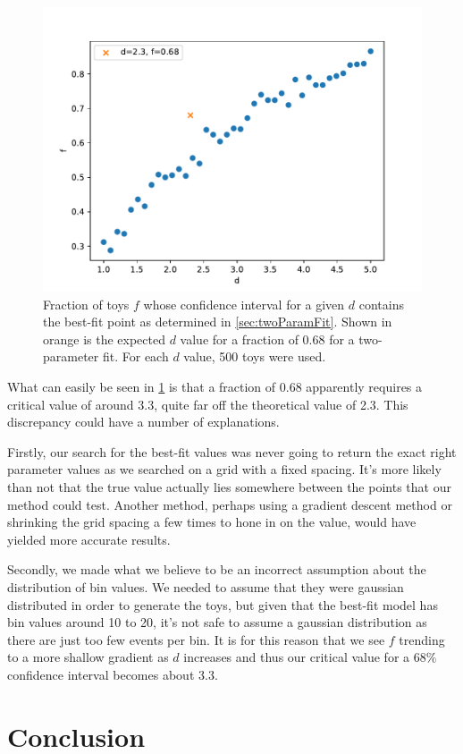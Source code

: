 \documentclass[11pt]{article}
\numberwithin{equation}{section}
\numberwithin{figure}{section}
\numberwithin{table}{section}
\begin{document}
\begin{figure}[h]
    \begin{center}
        \includegraphics[width=.8\textwidth]{Plots/d_f.pdf}
        \caption{Fraction of toys $f$ whose confidence interval for a given $d$ contains the best-fit point as determined in \cref{sec:twoParamFit}. Shown in orange is the expected $d$ value for a fraction of 0.68 for a two-parameter fit. For each $d$ value, 500 toys were used.}
        \label{fig:d_f}
    \end{center}
\end{figure}

What can easily be seen in \cref{fig:d_f} is that a fraction of 0.68 apparently requires a critical value of around 3.3, quite far off the theoretical value of 2.3. This discrepancy could have a number of explanations. 

Firstly, our search for the best-fit values was never going to return the exact right parameter values as we searched on a grid with a fixed spacing. It's more likely than not that the true value actually lies somewhere between the points that our method could test. Another method, perhaps using a gradient descent method or shrinking the grid spacing a few times to hone in on the value, would have yielded more accurate results. 

Secondly, we made what we believe to be an incorrect assumption about the distribution of bin values. We needed to assume that they were gaussian distributed in order to generate the toys, but given that the best-fit model has bin values around 10 to 20, it's not safe to assume a gaussian distribution as there are just too few events per bin. It is for this reason that we see $f$ trending to a more shallow gradient as $d$ increases and thus our critical value for a $68\%$ confidence interval becomes about 3.3. 

\section{Conclusion}\label{sec:Conclusion}



\newpage
\printbibliography

% 
\end{document}

